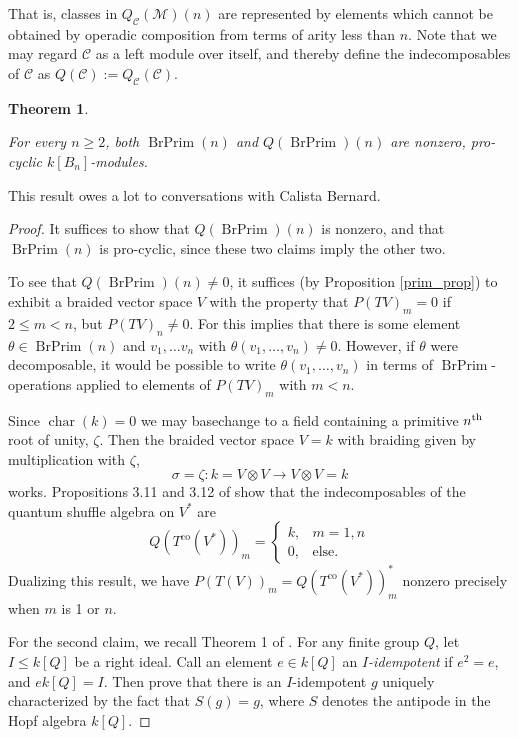 \documentclass[12pt]{article}
\DeclareMathOperator{\car}{char}
\DeclareMathOperator{\BrPrim}{BrPrim}
\DeclareMathOperator{\co}{co}
\newcommand{\CC} {\mathcal{C}}
\newcommand{\MM}{\mathcal{M}}
\newcommand{\nth}{\textsuperscript{th}}
\theoremstyle{plain}
\newtheorem{thm}{Theorem}[section]
\theoremstyle{definition}
\theoremstyle{remark}
\begin{document}
That is, classes in $Q_{\CC}(\MM)(n)$ are represented by elements which cannot be obtained by operadic composition from terms of arity less than $n$.  Note that we may regard $\CC$ as a left module over itself, and thereby define the indecomposables of $\CC$ as $Q(\CC) := Q_{\CC}(\CC)$.

\begin{thm} \label{pro-cyclic_thm}

For every $n\geq 2$, both $\BrPrim(n)$ and $Q(\BrPrim)(n)$ are nonzero, pro-cyclic $k[B_n]$-modules.

\end{thm}

This result owes a lot to conversations with Calista Bernard.

\begin{proof}

It suffices to show that $Q(\BrPrim)(n)$ is nonzero, and that $\BrPrim(n)$ is pro-cyclic, since these two claims imply the other two.  

To see that $Q(\BrPrim)(n) \neq 0$, it suffices (by Proposition \ref{prim_prop}) to exhibit a braided vector space $V$ with the property that $P(TV)_m = 0$ if $2 \leq m < n$, but $P(TV)_n \neq 0$.  For this implies that there is some element $\theta \in \BrPrim(n)$ and $v_1, \dots v_n$ with $\theta(v_1, \dots, v_n) \neq 0$.  However, if $\theta$ were decomposable, it would be possible to write $\theta(v_1, \dots, v_n)$ in terms of $\BrPrim$-operations applied to elements of $P(TV)_m$ with $m<n$.

Since $\car(k) = 0$ we may basechange to a field containing a primitive $n\nth$ root of unity, $\zeta$.  Then the braided vector space $V = k$ with braiding given by multiplication with $\zeta$,
%
$$\sigma = \zeta: k = V \otimes V \to V \otimes V = k$$
%
works.  Propositions 3.11 and 3.12 of \cite{etw} show that the indecomposables of the quantum shuffle algebra on $V^*$ are 
%
$$Q(T^{\co}(V^*))_m = \left\{ \begin{array}{ll} k, & m=1, n \\ 0, & \mbox{else.} \end{array}\right.$$
%
Dualizing this result, we have $P(T(V))_m = Q(T^{\co}(V^*))^*_m$ nonzero precisely when $m$ is 1 or $n$.

For the second claim, we recall Theorem 1 of \cite{prs}.   For any finite group $Q$, let $I \leq k[Q]$ be a right ideal.  Call an element $e \in k[Q]$ an \emph{$I$-idempotent} if $e^2=e$, and $e k[Q] = I$.  Then \cite{prs} prove that there is an $I$-idempotent $g$ uniquely characterized by the fact that $S(g) = g$, where $S$ denotes the antipode in the Hopf algebra $k[Q]$.


\end{proof}
\end{document}
